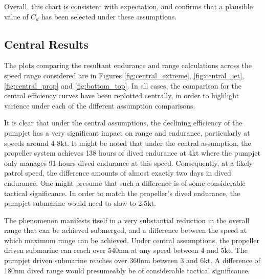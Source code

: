 \documentclass{article}\usepackage[]{graphicx}\usepackage[]{color}
\begin{document}
Overall, this chart is consistent with expectation, and confirms that a plausible value of $C_d$ has been selected under these assumptions.

\subsection{Central Results}
The plots comparing the resultant endurance and range calculations across the speed range considered are in Figures \ref{fig:central_extreme}, \ref{fig:central_jet}, \ref{fig:central_prop} and \ref{fig:bottom_top}.  In all cases, the comparison for the central efficiency curves have been replotted centrally, in order to highlight varience under each of the different assumption comparisons.

It is clear that under the central assumptions, the declining efficiency of the pumpjet has a very significant impact on range and endurance, particularly at speeds around 4-8kt. It might be noted that under the central assumption, the propeller system achieves 138 hours of dived endurance at 4kt where the pumpjet only manages 91 hours dived endurance at this speed.  Consequently, at a likely patrol speed, the difference amounts of almost exactly two days in dived endurance. One might presume that such a difference is of some considerable tactical significance.  In order to match the propeller's dived endurance, the pumpjet submarine would need to slow to 2.5kt.

The phenomenon manifests itself in a very substantial reduction in the overall range that can be achieved submerged, and a difference between the speed at which maximum range can be achieved.  Under central assumptions, the propeller driven submarine can reach over 540nm at any speed between 4 and 5kt. The pumpjet driven submarine reaches over 360nm between 3 and 6kt. A difference of 180nm dived range would presumeably be of considerable tactical significance.
\end{document}
